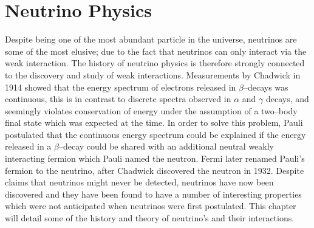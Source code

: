 \chapter{\label{ch:2-neutrinophysics}Neutrino Physics} 


 



Despite being one of the most abundant particle in the universe, neutrinos are 
some of the most elusive; due to the fact that neutrinos can only interact via
the weak interaction. The history of neutrino physics is therefore strongly
connected to the discovery and study of weak interactions. Measurements by
Chadwick in 1914 showed that the energy spectrum of electrons released in
\(\beta\)--decays was continuous, this is in contrast to discrete spectra
observed in \(\alpha\) and \(\gamma\) decays, and seemingly violates
conservation of energy under the assumption of a two--body final state which was
expected at the time. In order to solve this problem, Pauli postulated that the
continuous energy spectrum could be explained if the energy released in a 
\(\beta\)--decay could be shared with an additional neutral weakly interacting 
fermion which Pauli named the neutron. Fermi later renamed Pauli's fermion to
the neutrino, after Chadwick discovered the neutron in 1932. Despite claims that
neutrinos might never be detected, neutrinos have now been discovered and they
have been found to have a number of interesting properties which were not
anticipated when neutrinos were first postulated. This chapter will detail some 
of the history and theory of neutrino's and their interactions.

